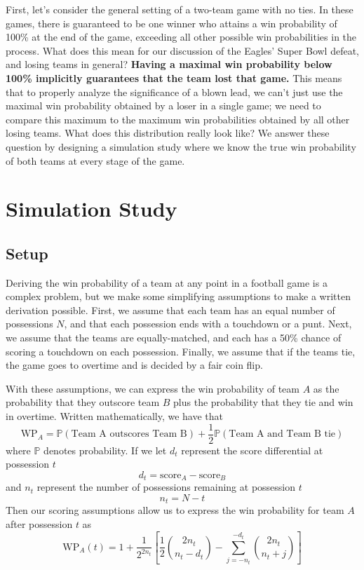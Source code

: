 \documentclass[12pt,letterpaper]{article}  %
\begin{document}
    First, let's consider the general setting of a two-team game with no ties. In these games, there is guaranteed to be one winner who attains a win probability of 100\% at the end of the game, exceeding all other possible win probabilities in the process. What does this mean for our discussion of the Eagles' Super Bowl defeat, and losing teams in general? \textbf{Having a maximal win probability below 100\% implicitly guarantees that the team lost that game.} This means that to properly analyze the significance of a blown lead, we can't just use the maximal win probability obtained by a loser in a single game; we need to compare this maximum to the maximum win probabilities obtained by all other losing teams. What does this distribution really look like? We answer these question by designing a simulation study where we know the true win probability of both teams at every stage of the game.

    \section*{Simulation Study}

    \subsection*{Setup}

    Deriving the win probability of a team at any point in a football game is a complex problem, but we make some simplifying assumptions to make a written derivation possible. First, we assume that each team has an equal number of possessions $N$, and that each possession ends with a touchdown or a punt. Next, we assume that the teams are equally-matched, and each has a 50\% chance of scoring a touchdown on each possession. Finally, we assume that if the teams tie, the game goes to overtime and is decided by a fair coin flip.

    With these assumptions, we can express the win probability of team $A$ as the probability that they outscore team $B$ plus the probability that they tie and win in overtime. Written mathematically, we have that
    \begin{equation*}
        \text{WP}_A = \mathbb{P}(\text{Team A outscores Team B}) + \frac{1}{2} \mathbb{P}(\text{Team A and Team B tie})
    \end{equation*}
    where $\mathbb{P}$ denotes probability. If we let $d_t$ represent the score differential at possession $t$
    \begin{equation*}
        d_t = \text{score}_A - \text{score}_B
    \end{equation*}
    and $n_t$ represent the number of possessions remaining at possession $t$
    \begin{equation*}
        n_t = N - t
    \end{equation*}
    Then our scoring assumptions allow us to express the win probability for team $A$ after possession $t$ as
    \begin{equation*}
        \text{WP}_A(t) = 1 + \frac{1}{2^{2n_t}} \left[\frac{1}{2} \binom{2n_t}{n_t - d_t} -\sum_{j = -n_t}^{-d_t} \binom{2n_t}{n_t + j}\right]
    \end{equation*}
\end{document}
